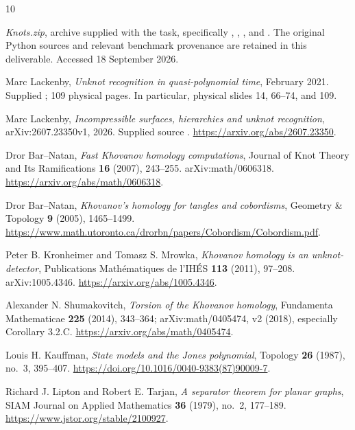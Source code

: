 \documentclass[11pt,a4paper]{article}
\theoremstyle{definition}\newtheorem{remark}[theorem]{Remark}
\begin{document}
\clearpage
\begin{thebibliography}{10}
\raggedright
{}
\emph{Knots.zip}, archive supplied with the task, specifically
, , , and
. The original Python sources and relevant benchmark provenance are
retained in this deliverable. Accessed 18 September 2026.

Marc Lackenby, \emph{Unknot recognition in quasi-polynomial time}, February 2021.
Supplied ; 109 physical pages. In particular,
physical slides 14, 66--74, and 109.

Marc Lackenby, \emph{Incompressible surfaces, hierarchies and unknot recognition},
arXiv:2607.23350v1, 2026. Supplied source
.
\url{https://arxiv.org/abs/2607.23350}.

Dror Bar--Natan, \emph{Fast Khovanov homology computations},
Journal of Knot Theory and Its Ramifications \textbf{16} (2007), 243--255.
arXiv:math/0606318.
\url{https://arxiv.org/abs/math/0606318}.

Dror Bar--Natan, \emph{Khovanov's homology for tangles and cobordisms},
Geometry \& Topology \textbf{9} (2005), 1465--1499.
\url{https://www.math.utoronto.ca/drorbn/papers/Cobordism/Cobordism.pdf}.

Peter B. Kronheimer and Tomasz S. Mrowka,
\emph{Khovanov homology is an unknot-detector},
Publications Math\'ematiques de l'IH\'ES \textbf{113} (2011), 97--208.
arXiv:1005.4346.
\url{https://arxiv.org/abs/1005.4346}.

Alexander N. Shumakovitch, \emph{Torsion of the Khovanov homology},
Fundamenta Mathematicae \textbf{225} (2014), 343--364;
arXiv:math/0405474, v2 (2018), especially Corollary 3.2.C.
\url{https://arxiv.org/abs/math/0405474}.

Louis H. Kauffman, \emph{State models and the Jones polynomial},
Topology \textbf{26} (1987), no.~3, 395--407.
\url{https://doi.org/10.1016/0040-9383(87)90009-7}.

Richard J. Lipton and Robert E. Tarjan, \emph{A separator theorem for planar graphs},
SIAM Journal on Applied Mathematics \textbf{36} (1979), no.~2, 177--189.
\url{https://www.jstor.org/stable/2100927}.
\end{thebibliography}
\end{document}

